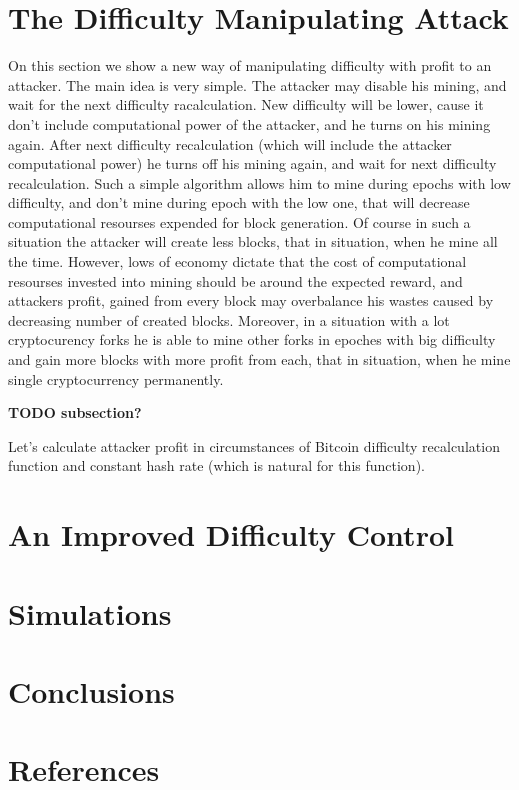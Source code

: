 \documentclass[number,preprint,review]{elsarticle}
\begin{document}
\section{The Difficulty Manipulating Attack}

On this section we show a new way of manipulating difficulty with profit to an attacker.
The main idea is very simple.
The attacker may disable his mining, and wait for the next difficulty racalculation.
New difficulty will be lower, cause it don't include computational power of the attacker, and he turns on his mining again.
After next difficulty recalculation (which will include the attacker computational power) he turns off his mining again, and wait for next difficulty recalculation.
Such a simple algorithm allows him to mine during epochs with low difficulty, and don't mine during epoch with the low one, that will decrease computational resourses expended for block generation.
Of course in such a situation the attacker will create less blocks, that in situation, when he mine all the time.
However, lows of economy dictate that the cost of computational resourses invested into mining should be around the expected reward, and attackers profit, gained from every block may overbalance his wastes caused by decreasing number of created blocks.
Moreover, in a situation with a lot cryptocurency forks he is able to mine other forks in epoches with big difficulty and gain more blocks with more profit from each, that in situation, when he mine single cryptocurrency permanently.

 \textbf{TODO subsection?}

Let's calculate attacker profit in circumstances of Bitcoin difficulty recalculation function and constant hash rate (which is natural for this function).

\section{An Improved Difficulty Control}

\section{Simulations}


\section{Conclusions}
\label{prot_improv}

\section*{References}



\end{document}
